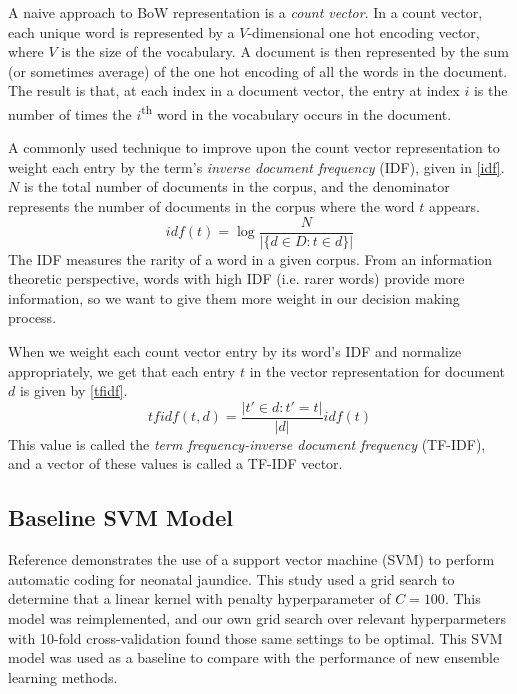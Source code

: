 \documentclass[conference]{IEEEtran}
\begin{document}
A naive approach to BoW representation is a \textit{count vector}. In a count vector, each unique word is represented by a $V$-dimensional one hot encoding vector, where $V$ is the size of the vocabulary. A document is then represented by the sum (or sometimes average) of the one hot encoding of all the words in the document. The result is that, at each index in a document vector, the entry at index $i$ is the number of times the $i$\textsuperscript{th} word in the vocabulary occurs in the document.

A commonly used technique to improve upon the count vector representation to weight each entry by the term's \textit{inverse document frequency} (IDF), given in \eqref{idf}. $N$ is the total number of documents in the corpus, and the denominator represents the number of documents in the corpus where the word $t$ appears.
\begin{equation}
idf(t) = \log \frac{N}{|\{d \in D : t \in d\} |}\label{idf}
\end{equation}
The IDF measures the rarity of a word in a given corpus. From an information theoretic perspective, words with high IDF (i.e. rarer words) provide more information, so we want to give them more weight in our decision making process.

When we weight each count vector entry by its word's IDF and normalize appropriately, we get that each entry $t$ in the vector representation for document $d$ is given by \eqref{tfidf}.
\begin{equation}
tfidf(t, d) = \frac{|t' \in d : t' = t|}{|d|} idf(t)\label{tfidf}
\end{equation}
This value is called the \textit{term frequency-inverse document frequency} (TF-IDF), and a vector of these values is called a TF-IDF vector.

\subsection{Baseline SVM Model}\label{AA}
Reference \cite{MARAFINO} demonstrates the use of a support vector machine (SVM) to perform automatic coding for neonatal jaundice. This study used a grid search to determine that a linear kernel with penalty hyperparameter of $C = 100$. This model was reimplemented, and our own grid search over relevant hyperparmeters with 10-fold cross-validation found those same settings to be optimal. This SVM model was used as a baseline to compare with the performance of new ensemble learning methods. 
\end{document}
